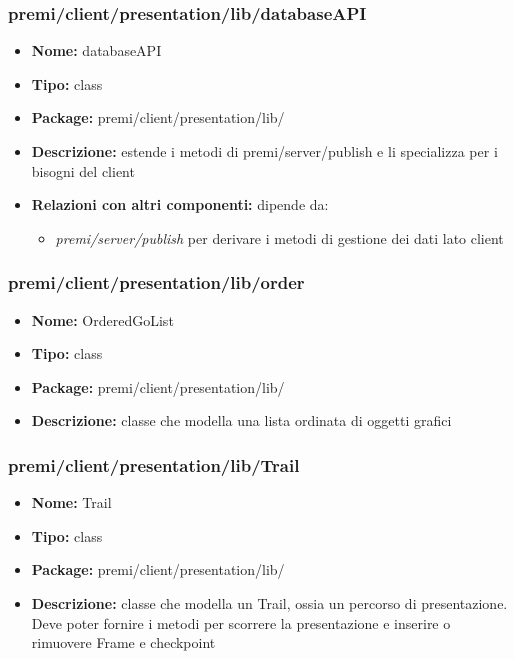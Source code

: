 \subsubsection{premi/client/presentation/lib/databaseAPI}
\begin{itemize}
  \item[] \textbf{Nome:} databaseAPI
  \item[] \textbf{Tipo:} class
  \item[] \textbf{Package:} premi/client/presentation/lib/
  \item[] \textbf{Descrizione:} estende i metodi di premi/server/publish e li specializza per i bisogni del client
   \item[] \textbf{Relazioni con altri componenti:} dipende da:
 \begin{itemize}
 \item \textit{premi/server/publish} per derivare i metodi di gestione dei dati lato client
 \end{itemize}
\end{itemize}


\subsubsection{premi/client/presentation/lib/order}
\begin{itemize}
  \item[] \textbf{Nome:} OrderedGoList
  \item[] \textbf{Tipo:} class
  \item[] \textbf{Package:} premi/client/presentation/lib/
  \item[] \textbf{Descrizione:} classe che modella una lista ordinata di oggetti grafici
\end{itemize}
  
\subsubsection{premi/client/presentation/lib/Trail}
\begin{itemize}
  \item[] \textbf{Nome:} Trail
  \item[] \textbf{Tipo:} class
  \item[] \textbf{Package:} premi/client/presentation/lib/
  \item[] \textbf{Descrizione:} classe che modella un Trail, ossia un percorso di presentazione. Deve poter fornire i metodi per scorrere la presentazione e inserire o rimuovere Frame e checkpoint
\end{itemize}

